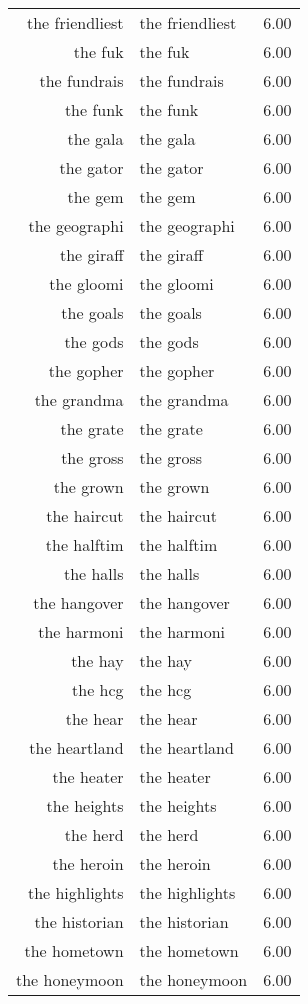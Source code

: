 \begin{table}[ht]
\begin{tabular}{rlr}
  the friendliest & the friendliest & 6.00 \\ 
  the fuk & the fuk & 6.00 \\ 
  the fundrais & the fundrais & 6.00 \\ 
  the funk & the funk & 6.00 \\ 
  the gala & the gala & 6.00 \\ 
  the gator & the gator & 6.00 \\ 
  the gem & the gem & 6.00 \\ 
  the geographi & the geographi & 6.00 \\ 
  the giraff & the giraff & 6.00 \\ 
  the gloomi & the gloomi & 6.00 \\ 
  the goals & the goals & 6.00 \\ 
  the gods & the gods & 6.00 \\ 
  the gopher & the gopher & 6.00 \\ 
  the grandma & the grandma & 6.00 \\ 
  the grate & the grate & 6.00 \\ 
  the gross & the gross & 6.00 \\ 
  the grown & the grown & 6.00 \\ 
  the haircut & the haircut & 6.00 \\ 
  the halftim & the halftim & 6.00 \\ 
  the halls & the halls & 6.00 \\ 
  the hangover & the hangover & 6.00 \\ 
  the harmoni & the harmoni & 6.00 \\ 
  the hay & the hay & 6.00 \\ 
  the hcg & the hcg & 6.00 \\ 
  the hear & the hear & 6.00 \\ 
  the heartland & the heartland & 6.00 \\ 
  the heater & the heater & 6.00 \\ 
  the heights & the heights & 6.00 \\ 
  the herd & the herd & 6.00 \\ 
  the heroin & the heroin & 6.00 \\ 
  the highlights & the highlights & 6.00 \\ 
  the historian & the historian & 6.00 \\ 
  the hometown & the hometown & 6.00 \\ 
  the honeymoon & the honeymoon & 6.00 \\ 

\end{tabular}
\end{table}
